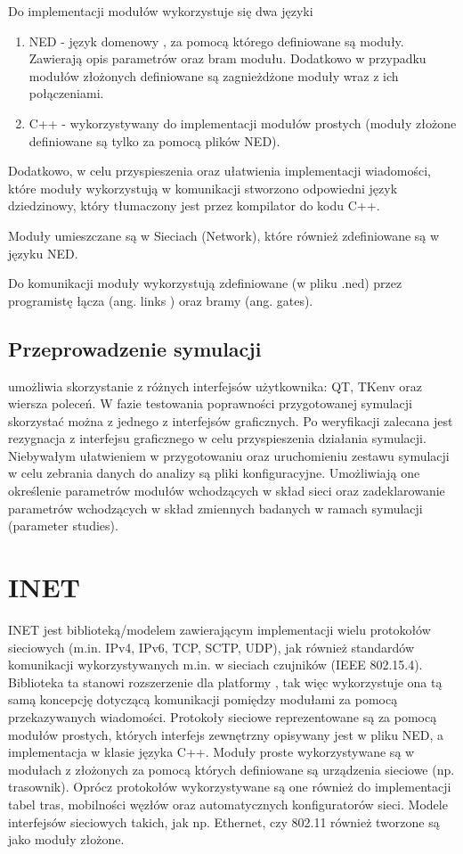 Do implementacji modułów wykorzystuje się dwa języki
\begin{enumerate}
	\item NED - język domenowy \omnetpp, za pomocą którego definiowane są moduły. Zawierają opis parametrów oraz bram modułu. Dodatkowo w przypadku modułów złożonych definiowane są zagnieżdżone moduły wraz z ich połączeniami.
	\item C++ - wykorzystywany do implementacji modułów prostych (moduły złożone definiowane są tylko za pomocą plików NED).
\end{enumerate}
Dodatkowo, w celu przyspieszenia oraz ułatwienia implementacji wiadomości, które moduły wykorzystują w komunikacji stworzono odpowiedni język dziedzinowy, który tłumaczony jest przez kompilator do kodu C++.

Moduły umieszczane są w Sieciach (Network), które również zdefiniowane są w języku NED.

Do komunikacji moduły wykorzystują zdefiniowane (w pliku .ned) przez programistę łącza (ang. links ) oraz bramy (ang. gates).
\subsection{Przeprowadzenie symulacji}
\omnetpp umożliwia skorzystanie z różnych interfejsów użytkownika: QT, TKenv oraz wiersza poleceń. W fazie testowania poprawności przygotowanej symulacji skorzystać można z jednego z interfejsów graficznych. Po weryfikacji zalecana jest rezygnacja z interfejsu graficznego w celu przyspieszenia działania symulacji. Niebywałym ułatwieniem w przygotowaniu oraz uruchomieniu zestawu symulacji w celu zebrania danych do analizy są pliki konfiguracyjne. Umożliwiają one określenie parametrów modułów wchodzących w skład sieci oraz zadeklarowanie parametrów wchodzących w skład zmiennych badanych w ramach symulacji (parameter studies).
\section{INET}
INET jest biblioteką/modelem zawierającym implementacji wielu protokołów sieciowych (m.in. IPv4, IPv6, TCP, SCTP, UDP), jak również standardów komunikacji wykorzystywanych m.in. w sieciach czujników (IEEE 802.15.4)\cite{inet}. Biblioteka ta stanowi rozszerzenie dla platformy \omnetpp, tak więc wykorzystuje ona tą samą koncepcję dotyczącą komunikacji pomiędzy modułami za pomocą przekazywanych wiadomości. Protokoły sieciowe reprezentowane są za pomocą modułów prostych, których interfejs zewnętrzny opisywany jest w pliku NED, a implementacja w klasie języka C++. Moduły proste wykorzystywane są w modułach z złożonych za pomocą których definiowane są urządzenia sieciowe (np. trasownik). Oprócz protokołów wykorzystywane są one również do implementacji tabel tras, mobilności węzłów oraz automatycznych konfiguratorów sieci. Modele interfejsów sieciowych takich, jak np. Ethernet, czy 802.11 również tworzone są jako moduły złożone. 
